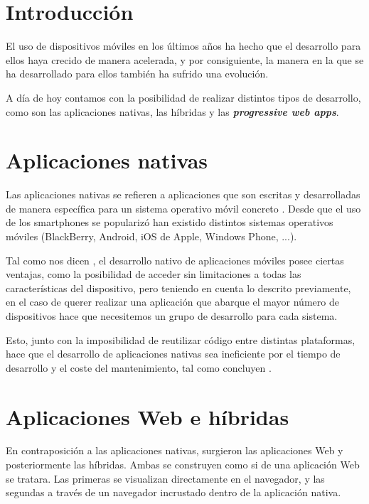 \documentclass{\ClassPath/viu-tfm-template}
\begin{document}
    \graphicspath{{../VIU_TFM_LaTeX_template/}}

    \coverpage

    \tableofcontents

\chapter{Introducción}

El uso de dispositivos móviles en los últimos años ha hecho que el desarrollo para ellos haya crecido de manera acelerada, y por consiguiente, la manera en la que se ha desarrollado para ellos también ha sufrido una evolución.

A día de hoy contamos con la posibilidad de realizar distintos tipos de desarrollo, como son las aplicaciones nativas, las híbridas y las \textbf{\textit{progressive web apps}}.

\chapter{Aplicaciones nativas}

Las aplicaciones nativas se refieren a aplicaciones que son escritas y desarrolladas de manera específica para un sistema operativo móvil concreto \parencite{Jobe_2013}. Desde que el uso de los smartphones se popularizó han existido distintos sistemas operativos móviles (BlackBerry, Android, iOS de Apple, Windows Phone, ...).

Tal como nos dicen \textcite{thomas_2020}, el desarrollo nativo de aplicaciones móviles posee ciertas ventajas, como la posibilidad de acceder sin limitaciones a todas las características del dispositivo, pero teniendo en cuenta lo descrito previamente, en el caso de querer realizar una aplicación que abarque el mayor número de dispositivos hace que necesitemos un grupo de desarrollo para cada sistema.

Esto, junto con la imposibilidad de reutilizar código entre distintas plataformas, hace que el desarrollo de aplicaciones nativas sea ineficiente por el tiempo de desarrollo y el coste del mantenimiento, tal como concluyen \textcite{xanthopoulos2013comparative}.


\chapter{Aplicaciones Web e híbridas}

En contraposición a las aplicaciones nativas, surgieron las aplicaciones Web y posteriormente las híbridas. Ambas se construyen como si de una aplicación Web se tratara. Las primeras se visualizan directamente en el navegador, y las segundas a través de un navegador incrustado dentro de la aplicación nativa.
\end{document}

